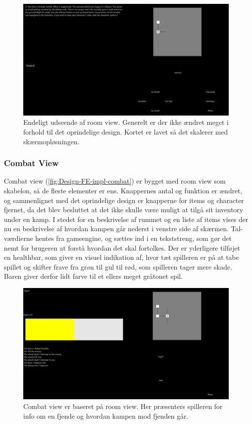 \begin{figure}[H]
\centering
\includegraphics[width = \textwidth]{02-Body/Images/room_final.PNG}
\caption{Endeligt udseende af room view. Generelt er der ikke ændret meget i forhold til det oprindelige design. Kortet er lavet så det skalerer med skærmopløsningen.}
\label{fig:Design-FE-impl-room}
\end{figure}

\subsubsection{Combat View}

Combat view (\autoref{fig:Design-FE-impl-combat}) er bygget med room view som skabelon, så de fleste elementer er ens. Knappernes antal og funktion er ændret, og sammenlignet med det oprindelige design er knapperne for items og character fjernet, da det blev besluttet at det ikke skulle være muligt at tilgå sit inventory under en kamp. I stedet for en beskrivelse af rummet og en liste af items vises der nu en beskrivelse af hvordan kampen går nederst i venstre side af skærmen. Tal-værdierne hentes fra gameengine, og sættes ind i en tekststreng, som gør det nemt for brugeren at forstå hvordan det skal fortolkes. Der er yderligere tilføjet en healthbar, som giver en visuel indikation af, hvor tæt spilleren er på at tabe spillet og skifter frave fra grøn til gul til rød, som spilleren tager mere skade. Baren giver derfor lidt farve til et ellers meget gråtonet spil.

\begin{figure}[H]
\centering
\includegraphics[width = \textwidth]{02-Body/Images/combat_final.PNG}
\caption{Combat view er baseret på room view. Her præsenters spilleren for info om en fjende og hvordan kampen mod fjenden går.}
\label{fig:Design-FE-impl-combat}
\end{figure}

